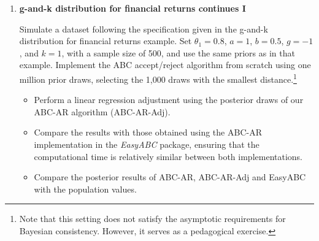 \begin{enumerate}
	\item \textbf{g-and-k distribution for financial returns continues I}
	
	Simulate a dataset following the specification given in the g-and-k distribution for financial returns example. Set $\theta_1 = 0.8$, $a = 1$, $b = 0.5$, $g = -1$, and $k = 1$, with a sample size of 500, and use the same priors as in that example. Implement the ABC accept/reject algorithm from scratch using one million prior draws, selecting the 1,000 draws with the smallest distance.\footnote{Note that this setting does not satisfy the asymptotic requirements for Bayesian consistency. However, it serves as a pedagogical exercise.}
	
	\begin{itemize}
		\item Perform a linear regression adjustment using the posterior draws of our ABC-AR algorithm (ABC-AR-Adj).
		\item Compare the results with those obtained using the ABC-AR implementation in the \textit{EasyABC} package, ensuring that the computational time is relatively similar between both implementations.
		\item Compare the posterior results of ABC-AR, ABC-AR-Adj and EasyABC with the population values.
	\end{itemize}
	

\end{enumerate}
